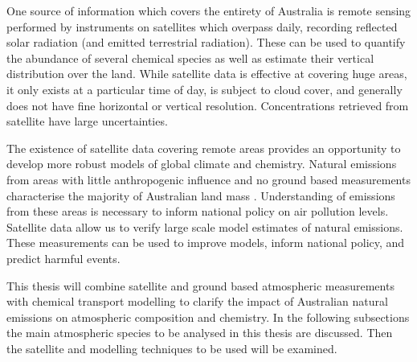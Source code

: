 One source of information which covers the entirety of Australia is remote sensing performed by instruments on satellites which overpass daily, recording reflected solar radiation (and emitted terrestrial radiation).
These can be used to quantify the abundance of several chemical species as well as estimate their vertical distribution over the land.
While satellite data is effective at covering huge areas, it only exists at a particular time of day, is subject to cloud cover, and generally does not have fine horizontal or vertical resolution.
Concentrations retrieved from satellite have large uncertainties.

The existence of satellite data covering remote areas provides an opportunity to develop more robust models of global climate and chemistry.
Natural emissions from areas with little anthropogenic influence and no ground based measurements characterise the majority of Australian land mass \cite{VanDerA_2008}.
Understanding of emissions from these areas is necessary to inform national policy on air pollution levels.
Satellite data allow us to verify large scale model estimates of natural emissions.
These measurements can be used to improve models, inform national policy, and predict harmful events.

This thesis will combine satellite and ground based atmospheric measurements with chemical transport modelling to clarify the impact of Australian natural emissions on atmospheric composition and chemistry.
In the following subsections the main atmospheric species to be analysed in this thesis are discussed.
Then the satellite and modelling techniques to be used will be examined.

